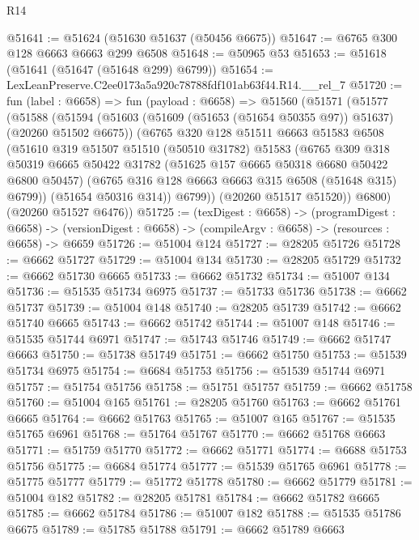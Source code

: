 \begin{lexlean}{R14}
\begin{coremodule}
@51641 := @51624 (@51630 @51637 (@50456 @6675))
@51647 := @6765 @300 @128 @6663 @6663 @299 @6508
@51648 := @50965 @53
@51653 := @51618 (@51641 (@51647 (@51648 @299) @6799))
@51654 := LexLeanPreserve.C2ee0173a5a920c78788fdf101ab63f44.R14.__rel_7
@51720 := fun (label : @6658) =>
  fun (payload : @6658) =>
  @51560
    (@51571
      (@51577
        (@51588
          (@51594
            (@51603 (@51609 (@51653 (@51654 @50355 @97)) @51637) (@20260 @51502 @6675))
            (@6765
              @320
              @128
              @51511
              @6663
              @51583
              @6508
              (@51610
                @319
                @51507
                @51510
                (@50510 @31782)
                @51583
                (@6765
                  @309
                  @318
                  @50319
                  @6665
                  @50422
                  @31782
                  (@51625 @157 @6665 @50318 @6680 @50422 @6800 @50457)
                  (@6765 @316 @128 @6663 @6663 @315 @6508 (@51648 @315) @6799))
                (@51654 @50316 @314))
              @6799))
          (@20260 @51517 @51520))
        @6800)
      (@20260 @51527 @6476))
@51725 := (texDigest : @6658) ->
  (programDigest : @6658) ->
  (versionDigest : @6658) -> (compileArgv : @6658) -> (resources : @6658) -> @6659
@51726 := @51004 @124
@51727 := @28205 @51726
@51728 := @6662 @51727
@51729 := @51004 @134
@51730 := @28205 @51729
@51732 := @6662 @51730 @6665
@51733 := @6662 @51732
@51734 := @51007 @134
@51736 := @51535 @51734 @6975
@51737 := @51733 @51736
@51738 := @6662 @51737
@51739 := @51004 @148
@51740 := @28205 @51739
@51742 := @6662 @51740 @6665
@51743 := @6662 @51742
@51744 := @51007 @148
@51746 := @51535 @51744 @6971
@51747 := @51743 @51746
@51749 := @6662 @51747 @6663
@51750 := @51738 @51749
@51751 := @6662 @51750
@51753 := @51539 @51734 @6975
@51754 := @6684 @51753
@51756 := @51539 @51744 @6971
@51757 := @51754 @51756
@51758 := @51751 @51757
@51759 := @6662 @51758
@51760 := @51004 @165
@51761 := @28205 @51760
@51763 := @6662 @51761 @6665
@51764 := @6662 @51763
@51765 := @51007 @165
@51767 := @51535 @51765 @6961
@51768 := @51764 @51767
@51770 := @6662 @51768 @6663
@51771 := @51759 @51770
@51772 := @6662 @51771
@51774 := @6688 @51753 @51756
@51775 := @6684 @51774
@51777 := @51539 @51765 @6961
@51778 := @51775 @51777
@51779 := @51772 @51778
@51780 := @6662 @51779
@51781 := @51004 @182
@51782 := @28205 @51781
@51784 := @6662 @51782 @6665
@51785 := @6662 @51784
@51786 := @51007 @182
@51788 := @51535 @51786 @6675
@51789 := @51785 @51788
@51791 := @6662 @51789 @6663

\end{coremodule}
\end{lexlean}
